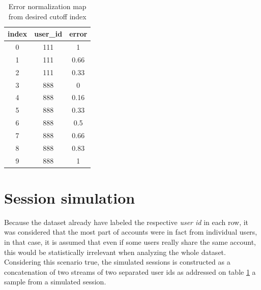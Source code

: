 \documentclass[ecp,tc,english]{iiufrgs}
\begin{document}
                    \begin{table}[H]
                \centering
                \begin{tabular}{c|c|c}
                    \hline
                    \rowcolor[RGB]{239,239,239}
                    index & user\_id & error \\
                    \hline 
                    \rowcolor[RGB]{140,140,140}
                    0 & 111 & 1 \\ 
                    \rowcolor[RGB]{197,197,197}
                    1 & 111 & 0.66 \\ 
                    \rowcolor[RGB]{226,226,226}
                    2 & 111 & 0.33 \\ 
                    \rowcolor[RGB]{255,255,255}
                    3 & 888 & 0 \\ 
                    \rowcolor[RGB]{239,239,239}
                    4 & 888 & 0.16 \\ 
                    \rowcolor[RGB]{222,222,222}
                    5 & 888 & 0.33 \\ 
                    \rowcolor[RGB]{206,206,206}
                    6 & 888 & 0.5 \\ 
                    \rowcolor[RGB]{189,189,189}
                    7 & 888 & 0.66 \\ 
                    \rowcolor[RGB]{173,173,173}
                    8 & 888 & 0.83 \\ 
                    \rowcolor[RGB]{140,140,140}
                    9 & 888 & 1 \\ 
                    \hline
                \end{tabular}
                \caption{Error normalization map from desired cutoff index}
                \label{tab:cutoff_table}
            \end{table}

        \section{Session simulation} \label{session_simulation}
        Because the dataset already have labeled the respective \textit{user id} in each row, it was considered that the most part of accounts were in fact from individual users, in that case, it is assumed that even if some users really share the same account, this would be statistically irrelevant when analyzing the whole dataset.
        Considering this scenario true, the simulated sessions is constructed as a concatenation of two streams of two separated user ids 
        as addressed on table \ref{session_simulation} a sample from a simulated session.
        
\end{document}
